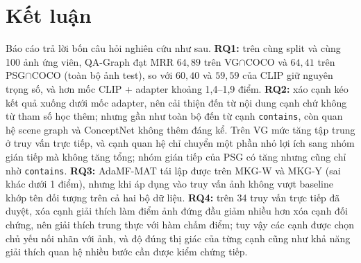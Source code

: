 \section{Kết luận}\label{sec:concl}
Báo cáo trả lời bốn câu hỏi nghiên cứu như sau. \textbf{RQ1:} trên cùng split và cùng 100 ảnh ứng viên, QA-Graph đạt MRR $64{,}89$ trên VG$\cap$COCO và $64{,}41$ trên PSG$\cap$COCO (toàn bộ ảnh test), so với $60{,}40$ và $59{,}59$ của CLIP giữ nguyên trọng số, và hơn mốc CLIP + adapter khoảng 1,4--1,9 điểm. \textbf{RQ2:} xáo cạnh kéo kết quả xuống dưới mốc adapter, nên cải thiện đến từ nội dung cạnh chứ không từ tham số học thêm; nhưng gần như toàn bộ đến từ cạnh \texttt{contains}, còn quan hệ scene graph và ConceptNet không thêm đáng kể. Trên VG mức tăng tập trung ở truy vấn trực tiếp, và cạnh quan hệ chỉ chuyển một phần nhỏ lợi ích sang nhóm gián tiếp mà không tăng tổng; nhóm gián tiếp của PSG có tăng nhưng cũng chỉ nhờ \texttt{contains}. \textbf{RQ3:} AdaMF-MAT tái lập được trên MKG-W và MKG-Y (sai khác dưới 1 điểm), nhưng khi áp dụng vào truy vấn ảnh không vượt baseline khớp tên đối tượng trên cả hai bộ dữ liệu. \textbf{RQ4:} trên 34 truy vấn trực tiếp đã duyệt, xóa cạnh giải thích làm điểm ảnh đứng đầu giảm nhiều hơn xóa cạnh đối chứng, nên giải thích trung thực với hàm chấm điểm; tuy vậy các cạnh được chọn chủ yếu nối nhãn với ảnh, và độ đúng thị giác của từng cạnh cũng như khả năng giải thích quan hệ nhiều bước cần được kiểm chứng tiếp.
